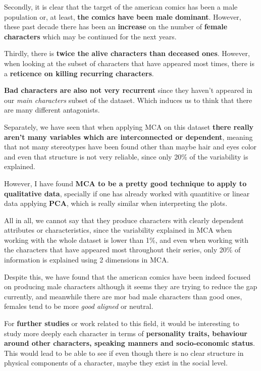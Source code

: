 Secondly, it is clear that the target of the american comics has been a male population or, at least, \textbf{the comics have been male dominant}. However, these past decade there has been an\textbf{ increase} on the number of \textbf{female characters} which may be continued for the next years.

Thirdly, there is \textbf{twice the alive characters than deceased ones}. However, when looking at the subset of characters that have appeared most times, there is a \textbf{reticence on killing recurring characters}.

\textbf{Bad characters are also not very recurrent} since they haven't appeared in our \textit{main characters} subset of the dataset. Which induces us to think that there are many different antagonists.


Separately, we have seen that when applying MCA on this dataset \textbf{there really aren't many variables which are interconnected or dependent}, meaning that not many stereotypes have been found other than maybe hair and eyes color and even that structure is not very reliable, since only 20\% of the variability is explained.

However, I have found \textbf{MCA to be a pretty good technique to apply to qualitative data}, specially if one has already worked with quantitive or linear data applying \textbf{PCA}, which is really similar when interpreting the plots.

All in all, we cannot say that they produce characters with clearly dependent attributes or characteristics, since the variability explained in MCA when working with the whole dataset is lower than 1\%, and even when working with the characters that have appeared most throughout their series, only 20\% of information is explained using 2 dimensions in MCA.

Despite this, we have found that the american comics have been indeed focused on producing male characters although it seems they are trying to reduce the gap currently, and meanwhile there are mor bad male characters than good ones, females tend to be more \textit{good aligned} or neutral.

For \textbf{further studies} or work related to this field, it would be interesting to study more deeply each character in terms of  \textbf{personality traits, behaviour around other characters, speaking manners and socio-economic status}. This would lead to be able to see if even though there is no clear structure in physical components of a character, maybe they exist in the social level.


\newpage
\nocite{*}

 

   

